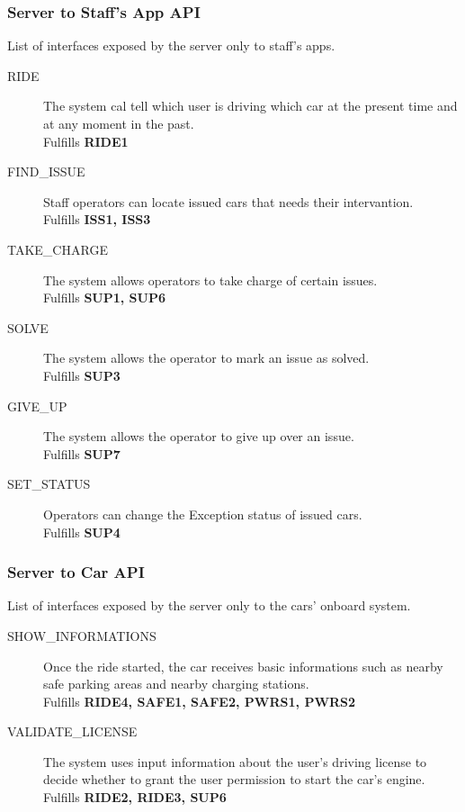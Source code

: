 \documentclass[11pt]{article} %
\begin{document}
\subsubsection{Server to Staff's App API}
List of interfaces exposed by the server only to staff's apps.
\begin{description}
	\item[RIDE] The system cal tell which user is driving which car at the present time and at any moment in the past. \\ Fulfills \textbf{RIDE1}
	\item[FIND\_ISSUE] Staff operators can locate issued cars that needs their intervantion. \\ Fulfills \textbf{ISS1, ISS3}
	\item[TAKE\_CHARGE] The system allows operators to take charge of certain issues. \\ Fulfills \textbf{SUP1, SUP6}
	\item[SOLVE] The system allows the operator to mark an issue as solved. \\ Fulfills \textbf{SUP3}
	\item[GIVE\_UP] The system allows the operator to give up over an issue. \\ Fulfills \textbf{SUP7}
	\item[SET\_STATUS] Operators can change the Exception status of issued cars. \\ Fulfills \textbf{SUP4}
\end{description}


\subsubsection{Server to Car API}
List of interfaces exposed by the server only to the cars' onboard system.
\begin{description}
	\item[SHOW\_INFORMATIONS] Once the ride started, the car receives basic informations such as nearby safe parking areas and nearby charging stations. \\ Fulfills \textbf{RIDE4, SAFE1, SAFE2, PWRS1, PWRS2}
	\item[VALIDATE\_LICENSE] The system uses input information about the user's driving license to decide whether to grant the user permission to start the car's engine. \\ Fulfills \textbf{RIDE2, RIDE3, SUP6}
\end{description}
\end{document}
